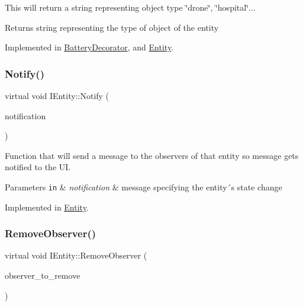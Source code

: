 This will return a string representing object type \char`\"{}drone\char`\"{}, \char`\"{}hospital\char`\"{}... 

\begin{DoxyReturn}{Returns}
string representing the type of object of the entity 
\end{DoxyReturn}


Implemented in \hyperlink{classBatteryDecorator_a606b100a52321dee5c36fe3942f8c396}{Battery\+Decorator}, and \hyperlink{classEntity_a05d8f23908e47ad19e762754461c62e6}{Entity}.

\mbox{\label{classIEntity_acd19cac6fe0e65495f80d1962320e0c3}} 
\subsubsection{\texorpdfstring{Notify()}{Notify()}}
{\footnotesize\ttfamily virtual void I\+Entity\+::\+Notify (\begin{DoxyParamCaption}\item[{picojson\+::object \&}]{notification }\end{DoxyParamCaption})\hspace{0.3cm}{\ttfamily [pure virtual]}}



Function that will send a message to the observers of that entity so message gets notified to the UI. 


\begin{DoxyParams}[1]{Parameters}
\mbox{\tt in}  & {\em notification} & message specifying the entity´s state change \\
\hline
\end{DoxyParams}


Implemented in \hyperlink{classEntity_a9e180b76d5dfa6652edcffaf0aea5ec0}{Entity}.

\mbox{\label{classIEntity_a651f1ca9f1e494af74e3f580b1c118d6}} 
\subsubsection{\texorpdfstring{Remove\+Observer()}{RemoveObserver()}}
{\footnotesize\ttfamily virtual void I\+Entity\+::\+Remove\+Observer (\begin{DoxyParamCaption}\item[{\hyperlink{classIObserver}{I\+Observer} $\ast$}]{observer\+\_\+to\+\_\+remove }\end{DoxyParamCaption})\hspace{0.3cm}{\ttfamily [pure virtual]}}



